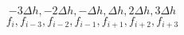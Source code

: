 \begin{equation} 
- 3 {\Delta h} , - 2 {\Delta h} , - {\Delta h} , {\Delta h} , 2 {\Delta h} , 3 {\Delta h}
 \end{equation} 
\begin{equation} 
f_{i} , f_{{i-3}} , f_{{i-2}} , f_{{i-1}} , f_{{i+1}} , f_{{i+2}} , f_{{i+3}}
 \end{equation}